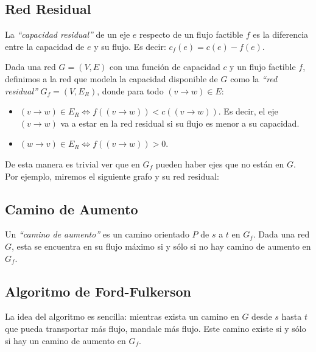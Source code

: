 
\subsection{Red Residual}

La \emph{``capacidad residual''} de un eje $e$ respecto de un flujo factible $f$ es la diferencia entre la capacidad de $e$ y su flujo. Es decir: $c_f(e) = c(e) - f(e)$.

Dada una red $G = (V, E)$ con una funci\'on de capacidad $c$ y un flujo factible $f$, definimos a la red que modela la capacidad disponible de $G$ como la \emph{``red residual''} $G_f = (V, E_{R})$, donde para todo $(v \rightarrow w) \in E$:

\begin{itemize}
\item $(v \rightarrow w) \in E_R \Longleftrightarrow f((v \rightarrow w)) < c((v \rightarrow w))$. Es decir, el eje $(v \rightarrow w)$ va a estar en la red residual si su flujo es menor a su capacidad.
\item $(w \rightarrow v) \in E_R \Longleftrightarrow f((v \rightarrow w)) > 0$.
\end{itemize}

De esta manera es trivial ver que en $G_f$ pueden haber ejes que no est\'an en $G$. Por ejemplo, miremos el siguiente grafo y su red residual:

\begin{figure}[htb]
    \centering
    
\end{figure}


\subsection{Camino de Aumento}

Un \emph{``camino de aumento''} es un camino orientado $P$ de $s$ a $t$ en $G_f$. Dada una red $G$, esta se encuentra en su flujo m\'aximo si y s\'olo si no hay camino de aumento en $G_f$.

\subsection{Algoritmo de Ford-Fulkerson}

La idea del algoritmo es sencilla: mientras exista un camino en $G$ desde $s$ hasta $t$ que pueda transportar m\'as flujo, mandale m\'as flujo. Este camino existe si y s\'olo si hay un camino de aumento en $G_f$.

